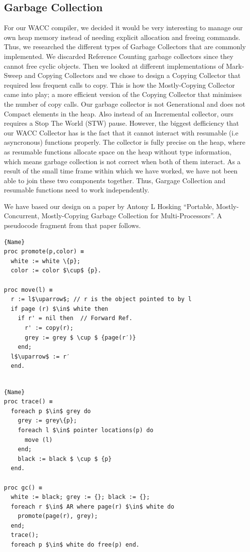 \documentclass{article}
\begin{document}
\subsection{Garbage Collection}
For our WACC compiler, we decided it would be very interesting to manage our own heap memory instead of needing explicit allocation and freeing commands. Thus, we researched the different types of Garbage Collectors that
are commonly implemented. We discarded Reference Counting garbage collectors since they cannot free cyclic objects. Then we looked at different implementations of Mark-Sweep and Copying Collectors and we chose to design a Copying Collector that required less frequent calls to copy. This is how the Mostly-Copying Collector came into play; a more efficient version of the Copying Collector that minimises the number of copy calls. Our garbage collector is not Generational and does not Compact elements in the heap. Also instead of an Incremental collector, ours requires a Stop The World (STW) pause. However, the biggest defficiency that our WACC Collector has is the fact that it cannot interact with resumable (i.e asyncronous) functions properly. The collector is fully precise on the heap, where as resumable functions allocate space on the heap without type information, which means garbage collection is not correct when both of them interact. As a result of the small time frame within which we have worked, we have not been able to join these two components together. Thus, Gargage Collection and resumable functions need to work independently. 



We have based our design on a paper by Antony L Hosking ``Portable, Mostly-Concurrent, Mostly-Copying Garbage Collection for Multi-Processors''. A pseudocode fragment from that paper follows. 

\noindent\begin{minipage}{.46\textwidth}
\begin{lstlisting}[caption=code 1,frame=tlrb, mathescape]{Name}
proc promote(p,color) ≡ 
  white := white \{p}; 
  color := color $\cup$ {p}.

proc move(l) ≡ 
  r := l$\uparrow$; // r is the object pointed to by l
  if page (r) $\in$ white then 
    if r' = nil then  // Forward Ref. 
      r' := copy(r);
      grey := grey $ \cup $ {page(r′)}
    end;
  l$\uparrow$ := r′
  end.


\end{lstlisting}
\end{minipage}\hfill
\begin{minipage}{.45\textwidth}
\begin{lstlisting}[caption=code 2,frame=tlrb, mathescape]{Name}
proc trace() ≡ 
  foreach p $\in$ grey do
    grey := grey\{p};
    foreach l $\in$ pointer locations(p) do
      move (l)
    end;
    black := black $ \cup $ {p}
  end.

proc gc() ≡
  white := black; grey := {}; black := {}; 
  foreach r $\in$ AR where page(r) $\in$ white do
    promote(page(r), grey);
  end;
  trace();
  foreach p $\in$ white do free(p) end.
\end{lstlisting}
\end{minipage}
\end{document}
